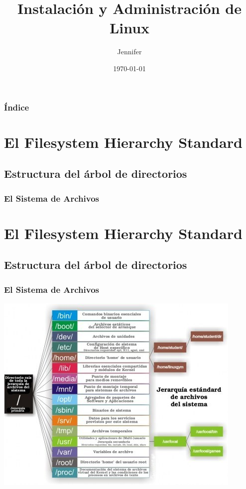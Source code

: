 \documentclass{beamer}
\title{Instalaci\'on y Administraci\'on de Linux}
\author{Jennifer }
\date{\today}
\begin{document}
\begin{frame}
\titlepage
\end{frame}

\setcounter{tocdepth}{1}

\begin{frame}[allowframebreaks]
\frametitle{\'Indice}
\tableofcontents
\end{frame}

\section{El Filesystem Hierarchy Standard}
\subsection{Estructura del \'arbol de directorios}
\begin{frame}
\setcounter{tocdepth}{3}
\tableofcontents[currentsection]
\frametitle{El Sistema de Archivos}
\end{frame} 

\section{El Filesystem Hierarchy Standard}
\subsection{Estructura del \'arbol de directorios}
\begin{frame}
\frametitle{El Sistema de Archivos}
\includegraphics[height=0.8\textheight]{fhs-esp.jpg} \hspace*{7.3cm}
\end{frame} 
\end{document}

